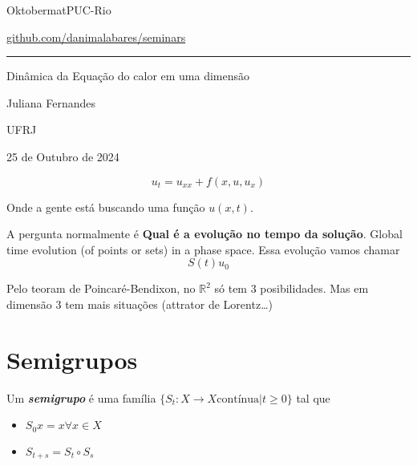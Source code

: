 \renewcommand*{\contentsname}{}  



\begin{minipage}{\textwidth}
	\begin{minipage}{1\textwidth}
		Oktobermat\hfill PUC-Rio
		
		{\small\hfill\href{https://github.com/danimalabares/seminars}{github.com/danimalabares/seminars}}
	\end{minipage}
\end{minipage}\vspace{.2cm}\hrule

\vspace{10pt}

{\Huge Dinâmica da Equação do calor em uma dimensão}

\vspace{1em}
\hfill{\Large Juliana Fernandes}

\hfill{\large UFRJ}

\hfill{\large 25 de Outubro de 2024}

\vspace{-2em}
\[u_{t}=u_{x x}+f(x,u,u_x)\]

Onde a gente está buscando uma função $u(x,t)$.

A pergunta normalmente  é \textbf{Qual é a evolução no tempo da solução}. Global time evolution  (of points or sets) in a phase space. Essa evolução vamos chamar
\[S(t)u_0\]

Pelo teoram de Poincaré-Bendixon, no $\mathbb{R}^{2}$ só tem 3 posibilidades. Mas em dimensão 3 tem mais situações (attrator de Lorentz…)

\section{Semigrupos}

\begin{defn}\leavevmode
	Um \textit{\textbf{semigrupo}} é uma família $\{S_t:X\to X \text{contínua} |t \geq 0\}$ 
	tal que
	 \begin{itemize}
	\item $S_0x=x \forall x \in X$
	\item $S_{t+s}=S_t \circ  S_s$
	\end{itemize}
\end{defn}

